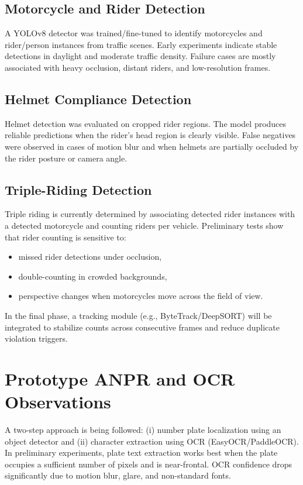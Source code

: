 \subsection{Motorcycle and Rider Detection}
A YOLOv8 detector was trained/fine-tuned to identify motorcycles and rider/person instances from traffic scenes. Early experiments indicate stable detections in daylight and moderate traffic density. Failure cases are mostly associated with heavy occlusion, distant riders, and low-resolution frames.

\subsection{Helmet Compliance Detection}
Helmet detection was evaluated on cropped rider regions. The model produces reliable predictions when the rider's head region is clearly visible. False negatives were observed in cases of motion blur and when helmets are partially occluded by the rider posture or camera angle.

\subsection{Triple-Riding Detection}
Triple riding is currently determined by associating detected rider instances with a detected motorcycle and counting riders per vehicle. Preliminary tests show that rider counting is sensitive to:
\begin{itemize}
    \item missed rider detections under occlusion,
    \item double-counting in crowded backgrounds,
    \item perspective changes when motorcycles move across the field of view.
\end{itemize}
In the final phase, a tracking module (e.g., ByteTrack/DeepSORT) will be integrated to stabilize counts across consecutive frames and reduce duplicate violation triggers.

\section{Prototype ANPR and OCR Observations}
\label{sec:anpr-ocr}

A two-step approach is being followed: (i) number plate localization using an object detector and (ii) character extraction using OCR (EasyOCR/PaddleOCR). In preliminary experiments, plate text extraction works best when the plate occupies a sufficient number of pixels and is near-frontal. OCR confidence drops significantly due to motion blur, glare, and non-standard fonts.

